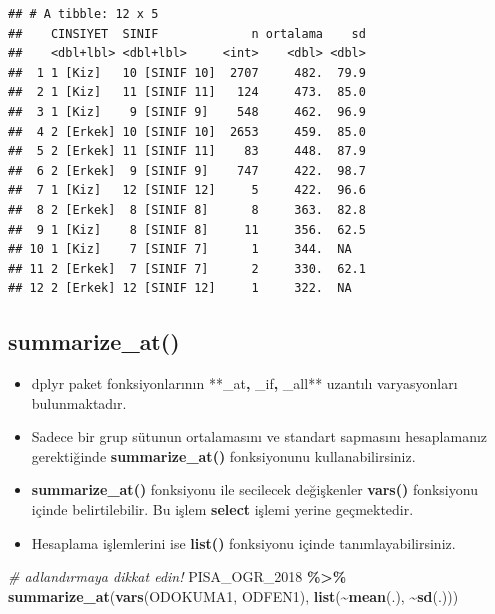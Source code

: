 \documentclass[
  oneside]{book}
\newenvironment{Shaded}{\begin{snugshade}}{\end{snugshade}}
\newcommand{\CommentTok}[1]{\textcolor[rgb]{0.56,0.35,0.01}{\textit{#1}}}
\newcommand{\FunctionTok}[1]{\textcolor[rgb]{0.13,0.29,0.53}{\textbf{#1}}}
\newcommand{\NormalTok}[1]{#1}
\newcommand{\SpecialCharTok}[1]{\textcolor[rgb]{0.81,0.36,0.00}{\textbf{#1}}}
\begin{document}
\begin{verbatim}
## # A tibble: 12 x 5
##    CINSIYET  SINIF             n ortalama    sd
##    <dbl+lbl> <dbl+lbl>     <int>    <dbl> <dbl>
##  1 1 [Kiz]   10 [SINIF 10]  2707     482.  79.9
##  2 1 [Kiz]   11 [SINIF 11]   124     473.  85.0
##  3 1 [Kiz]    9 [SINIF 9]    548     462.  96.9
##  4 2 [Erkek] 10 [SINIF 10]  2653     459.  85.0
##  5 2 [Erkek] 11 [SINIF 11]    83     448.  87.9
##  6 2 [Erkek]  9 [SINIF 9]    747     422.  98.7
##  7 1 [Kiz]   12 [SINIF 12]     5     422.  96.6
##  8 2 [Erkek]  8 [SINIF 8]      8     363.  82.8
##  9 1 [Kiz]    8 [SINIF 8]     11     356.  62.5
## 10 1 [Kiz]    7 [SINIF 7]      1     344.  NA  
## 11 2 [Erkek]  7 [SINIF 7]      2     330.  62.1
## 12 2 [Erkek] 12 [SINIF 12]     1     322.  NA
\end{verbatim}

\hypertarget{summarize_at}{%
\subsection{summarize\_at()}\label{summarize_at}}

\begin{itemize}
\item
  dplyr paket fonksiyonlarının **\_at\textbf{, }\_if\textbf{, }\_all** uzantılı varyasyonları bulunmaktadır.
\item
  Sadece bir grup sütunun ortalamasını ve standart sapmasını hesaplamanız gerektiğinde \textbf{summarize\_at()} fonksiyonunu kullanabilirsiniz.
\item
  \textbf{summarize\_at()} fonksiyonu ile secilecek değişkenler \textbf{vars()}
  fonksiyonu içinde belirtilebilir. Bu işlem \textbf{select} işlemi yerine geçmektedir.
\item
  Hesaplama işlemlerini ise \textbf{list()} fonksiyonu içinde tanımlayabilirsiniz.
\end{itemize}

\begin{Shaded}
\begin{Highlighting}[]
\CommentTok{\# adlandırmaya dikkat edin!}
\NormalTok{PISA\_OGR\_2018 }\SpecialCharTok{\%\textgreater{}\%}
    \FunctionTok{summarize\_at}\NormalTok{(}\FunctionTok{vars}\NormalTok{(ODOKUMA1, ODFEN1), }\FunctionTok{list}\NormalTok{(}\SpecialCharTok{\textasciitilde{}}\FunctionTok{mean}\NormalTok{(.), }\SpecialCharTok{\textasciitilde{}}\FunctionTok{sd}\NormalTok{(.)))}
\end{Highlighting}
\end{Shaded}
\end{document}
